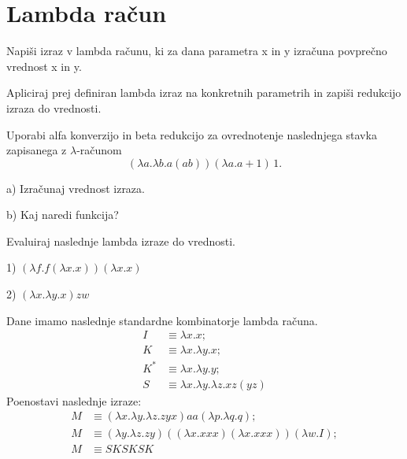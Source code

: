 \chapter{Lambda ra\v cun}


\begin{ex}
Napi\v si izraz v lambda ra\v cunu, ki za dana parametra x in y izra\v cuna povpre\v cno vrednost x in y.

Apliciraj prej definiran lambda izraz na konkretnih parametrih in zapi\v si redukcijo izraza do vrednosti.
\end{ex}




\begin{ex}
Uporabi alfa konverzijo in beta redukcijo za ovrednotenje naslednjega stavka zapisanega z $\lambda$-ra\v cunom
$$(\lambda a.\lambda b.a (a b)) (\lambda a.a + 1)\,1.$$

a) Izra\v cunaj vrednost izraza.

b) Kaj naredi funkcija?
\end{ex}




\begin{ex}
Evaluiraj naslednje lambda izraze do vrednosti.

1) $( \lambda f.f( \lambda x.x))( \lambda x.x) $

2) $( \lambda x. \lambda y.x) z w$

\end{ex}



\begin{ex}
Dane imamo naslednje standardne kombinatorje lambda ra\v cuna.
\begin{align*}
I& \equiv \lambda x.x;\\
K& \equiv \lambda x.\lambda y.x;\\
K^*& \equiv \lambda x.\lambda y.y;\\
S& \equiv \lambda x. \lambda y.\lambda z.xz(yz)
\end{align*}
Poenostavi naslednje izraze:
\begin{align*}
M &\equiv (\lambda x.\lambda y.\lambda z.zyx)aa(\lambda p.\lambda q.q);\\
M &\equiv (\lambda y.\lambda z.zy)((\lambda x.xxx)(\lambda x.xxx))(\lambda w.I);\\
M &\equiv SKSKSK
\end{align*}
\end{ex}



